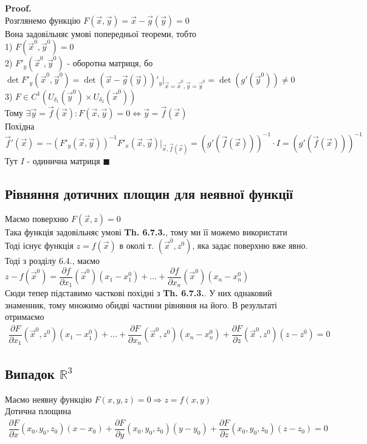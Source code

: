 \documentclass[a4paper, 14pt]{extarticle}
\def\bigline{\vspace{5mm}\\}
\theoremstyle{theoremdd}
\theoremstyle{theoremdd}
\theoremstyle{theoremdd}
\theoremstyle{theoremdd}
\theoremstyle{theoremdd}
\theoremstyle{theoremdd}
\theoremstyle{theoremdd}
\theoremstyle{theoremdd}
\newenvironment{pf}{\vspace*{-3mm} \textbf{Proof. \\}}{$\blacksquare$}
\def\departial#1#2{\dfrac{\partial {#1}}{\partial {#2}}}
\begin{document}
\begin{pf}
Розглянемо функцію $F(\vec{x},\vec{y}) = \vec{x} - \vec{g}(\vec{y}) = 0$\\
Вона задовільняє умові попередньої теореми, тобто\\
1) $F(\vec{x}^0, \vec{y}^0) = 0$\\
2) $F'_y(\vec{x}^0, \vec{y}^0)$ - оборотна матриця, бо \\
$\det F'_y(\vec{x}^0,\vec{y}^0) = \det (\vec{x}-\vec{g}(\vec{y}))'_y \Big|_{\vec{x} = \vec{x}^0, \vec{y} = \vec{y}^0} = \det (g'(\vec{y}^0)) \neq 0$\\
3) $F \in C^{1}(U_{\delta_1}(\vec{y}^0) \times U_{\delta_2}(\vec{x}^0))$\\
Тому $\exists \vec{y} = \vec{f}(\vec{x}): F(\vec{x}, \vec{y}) = 0 \iff \vec{y} = \vec{f}(\vec{x})$\\
Похідна \\ $\vec{f}'(\vec{x}) = -(F'_y(\vec{x}, \vec{y}))^{-1} F'_x(\vec{x},\vec{y})|_{\vec{x}, \vec{f}(\vec{x})} = (g'(\vec{f}(\vec{x})))^{-1} \cdot I = (g'(\vec{f}(\vec{x})))^{-1}$ \\
Тут $I$ - одинична матриця
\end{pf}
\bigline

\subsection{Рівняння дотичних площин для неявної функції}
Маємо поверхню $F(\vec{x}, z) = 0$\\
Така функція задовільняє умові \textbf{Th. 6.7.3.}, тому ми її можемо використати\\
Тоді існує функція $z = f(\vec{x})$ в околі т. $(\vec{x}^0, z^0)$, яка задає поверхню вже явно. Тоді з розділу 6.4., маємо\\
$z - f(\vec{x}^0) = \departial{f}{x_1}(\vec{x}^0)(x_1-x_1^0) + \dots + \departial{f}{x_n}(\vec{x}^0)(x_n-x_n^0)$\\
Сюди тепер підставимо часткові похідні з \textbf{Th. 6.7.3.}. У них однаковий знаменник, тому множимо обидві частини рівняння на його. В результаті отримаємо
\begin{align*}
\departial{F}{x_1}(\vec{x}^0,z^0)(x_1-x_1^0) + \dots + \departial{F}{x_n}(\vec{x}^0,z^0)(x_n-x_n^0) + \departial{F}{z}(\vec{x}^0,z^0)(z-z^0) = 0
\end{align*}

\subsection*{Випадок $\mathbb{R}^3$}
Маємо неявну функцію $F(x,y,z) = 0 \Rightarrow z = f(x,y)$\\
Дотична площина
\begin{align*}
\departial{F}{x}(x_0,y_0,z_0)(x-x_0) + \departial{F}{y}(x_0,y_0,z_0)(y-y_0) + \departial{F}{z}(x_0,y_0,z_0)(z-z_0) = 0
\end{align*}
\end{document}
